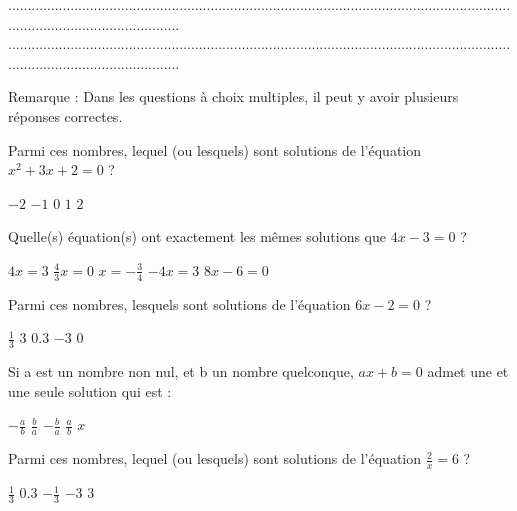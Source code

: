 \documentclass[10pt,a4paper]{exam}
\begin{document}
.............................................................................................................................................................................\newline
.............................................................................................................................................................................
 
 
\vspace{20 mm}


Remarque : Dans les questions à choix multiples, il peut y avoir plusieurs réponses correctes.

Parmi ces nombres, lequel (ou lesquels) sont solutions de l'équation   $x^2 + 3x + 2 = 0$ ?\newline
\begin{oneparcheckboxes}
   \choice $-2$
   \choice $-1$
   \choice $0$
   \choice $1$
   \choice $2$
\end{oneparcheckboxes}

 
Quelle(s) équation(s) ont exactement les mêmes solutions que $4x-3=0$ ?\newline
\begin{oneparcheckboxes}
   \choice $4x = 3$
   \choice $\frac{4}{3}x= 0$
   \choice $x= -\frac{3}{4}$
   \choice $-4x = 3$
   \choice $8x-6=0$
\end{oneparcheckboxes}
 

Parmi ces nombres, lesquels sont solutions de l'équation   $6x-2=0$ ?\newline
\begin{oneparcheckboxes}
   \choice $\frac{1}{3}$
   \choice $3$
   \choice $0.3$
   \choice $-3$
   \choice $0$
\end{oneparcheckboxes}
 

Si a est un nombre non nul, et b un nombre quelconque, $ax+b=0$  admet une et une seule solution qui est :\newline
\begin{oneparcheckboxes}
   \choice $-\frac{a}{b}$
   \choice $\frac{b}{a}$
   \choice $-\frac{b}{a}$
   \choice $\frac{a}{b}$
   \choice $x$
\end{oneparcheckboxes}
 
Parmi ces nombres, lequel (ou lesquels) sont solutions de l'équation   $\frac{2}{x}=6$ ?\newline
\begin{oneparcheckboxes}
   \choice $\frac{1}{3}$
   \choice $0.3$
   \choice $-\frac{1}{3}$
   \choice $-3$
   \choice $3$
\end{oneparcheckboxes}
 
\end{document}
